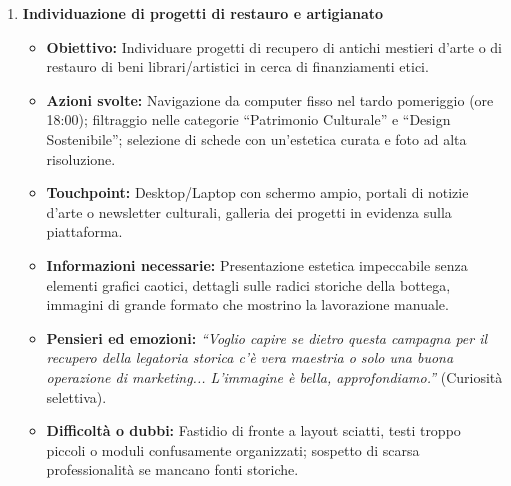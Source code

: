 \documentclass[11pt,a4paper]{article}
\begin{document}
    \begin{enumerate}

        \item \textbf{Individuazione di progetti di restauro e artigianato}
        \begin{itemize}
            \item \textbf{Obiettivo:} Individuare progetti di recupero di antichi mestieri d'arte o di restauro di beni librari/artistici in cerca di finanziamenti etici.
            \item \textbf{Azioni svolte:} Navigazione da computer fisso nel tardo pomeriggio (ore 18:00); filtraggio nelle categorie ``Patrimonio Culturale'' e ``Design Sostenibile''; selezione di schede con un'estetica curata e foto ad alta risoluzione.
            \item \textbf{Touchpoint:} Desktop/Laptop con schermo ampio, portali di notizie d'arte o newsletter culturali, galleria dei progetti in evidenza sulla piattaforma.
            \item \textbf{Informazioni necessarie:} Presentazione estetica impeccabile senza elementi grafici caotici, dettagli sulle radici storiche della bottega, immagini di grande formato che mostrino la lavorazione manuale.
            \item \textbf{Pensieri ed emozioni:} \textit{``Voglio capire se dietro questa campagna per il recupero della legatoria storica c'è vera maestria o solo una buona operazione di marketing... L'immagine è bella, approfondiamo.''} (Curiosità selettiva).
            \item \textbf{Difficoltà o dubbi:} Fastidio di fronte a layout sciatti, testi troppo piccoli o moduli confusamente organizzati; sospetto di scarsa professionalità se mancano fonti storiche.
        \end{itemize}


\end{enumerate}
\end{document}
